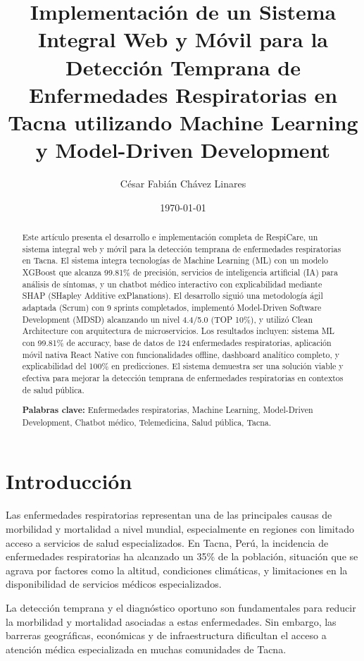 \documentclass[12pt,a4paper]{article}
\title{Implementación de un Sistema Integral Web y Móvil para la Detección Temprana de Enfermedades Respiratorias en Tacna utilizando Machine Learning y Model-Driven Development}
\author{César Fabián Chávez Linares}
\date{\today}
\begin{document}
\maketitle

\begin{abstract}
Este artículo presenta el desarrollo e implementación completa de RespiCare, un sistema integral web y móvil para la detección temprana de enfermedades respiratorias en Tacna. El sistema integra tecnologías de Machine Learning (ML) con un modelo XGBoost que alcanza 99.81\% de precisión, servicios de inteligencia artificial (IA) para análisis de síntomas, y un chatbot médico interactivo con explicabilidad mediante SHAP (SHapley Additive exPlanations). El desarrollo siguió una metodología ágil adaptada (Scrum) con 9 sprints completados, implementó Model-Driven Software Development (MDSD) alcanzando un nivel 4.4/5.0 (TOP 10\%), y utilizó Clean Architecture con arquitectura de microservicios. Los resultados incluyen: sistema ML con 99.81\% de accuracy, base de datos de 124 enfermedades respiratorias, aplicación móvil nativa React Native con funcionalidades offline, dashboard analítico completo, y explicabilidad del 100\% en predicciones. El sistema demuestra ser una solución viable y efectiva para mejorar la detección temprana de enfermedades respiratorias en contextos de salud pública.

\textbf{Palabras clave:} Enfermedades respiratorias, Machine Learning, Model-Driven Development, Chatbot médico, Telemedicina, Salud pública, Tacna.
\end{abstract}

\section{Introducción}

Las enfermedades respiratorias representan una de las principales causas de morbilidad y mortalidad a nivel mundial, especialmente en regiones con limitado acceso a servicios de salud especializados. En Tacna, Perú, la incidencia de enfermedades respiratorias ha alcanzado un 35\% de la población, situación que se agrava por factores como la altitud, condiciones climáticas, y limitaciones en la disponibilidad de servicios médicos especializados.

La detección temprana y el diagnóstico oportuno son fundamentales para reducir la morbilidad y mortalidad asociadas a estas enfermedades. Sin embargo, las barreras geográficas, económicas y de infraestructura dificultan el acceso a atención médica especializada en muchas comunidades de Tacna.
\end{document}
